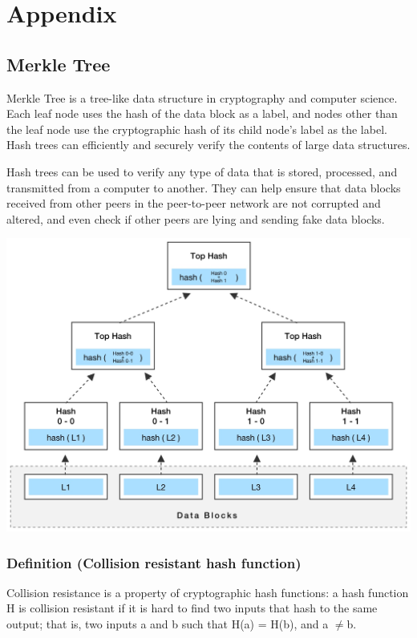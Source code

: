 \section{Appendix}

\subsection*{Merkle Tree}

Merkle Tree is a tree-like data structure in cryptography and computer science. Each leaf node uses the hash of the data block as a label, and nodes other than the leaf node use the cryptographic hash of its child node's label as the label. Hash trees can efficiently and securely verify the contents of large data structures.

Hash trees can be used to verify any type of data that is stored, processed, and transmitted from a computer to another. They can help ensure that data blocks received from other peers in the peer-to-peer network are not corrupted and altered, and even check if other peers are lying and sending fake data blocks.

\includegraphics[scale=0.2]{pic/Merkle Tree.jpg}

\subsubsection{Definition (Collision resistant hash function)}

Collision resistance is a property of cryptographic hash functions: a hash function H is collision resistant if it is hard to find two inputs that hash to the same output; that is, two inputs a and b such that H(a) = H(b), and a $\ne $b\cite{CR}.

